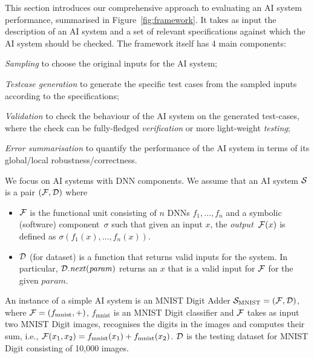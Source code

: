 \documentclass[10pt, conference, a4paper, final]{IEEEtran}
\begin{document}
This section introduces our comprehensive approach to evaluating an AI system performance, summarised in Figure~\ref{fig:framework}. It takes as input the description of an AI system and a set of relevant specifications against which the AI system should be checked. The framework itself has 4 main components: %
\begin{inparaenum}[\it (i)]
\item \emph{Sampling} to choose the original inputs for the AI system;
\item \emph{Testcase generation} to generate the specific test cases from the sampled inputs according to the specifications;
\item \emph{Validation} to check the behaviour of the AI system on the generated test-cases, where the check can be fully-fledged \emph{verification} or more light-weight \emph{testing};
\item \emph{Error summarisation} to quantify the performance of the AI system in terms of its global/local robustness/correctness.
\end{inparaenum}



We focus on AI systems with DNN components. We assume that an AI system $\S$ is a pair $(\F,\D)$ where
\begin{itemize}
\item $\F$ is the functional unit consisting of $n$ DNNs $f_1,\dots,f_n$ and a symbolic (software) component~$\sigma$ such that given an input $x$, the \emph{output}~$\F(x)$ is defined as $\sigma(f_1(x),\dots,f_n(x))$.
\item  $\D$ (for dataset) is a function that returns valid inputs for the system. In particular, $\D.\mathit{next}(\mathit{param})$ returns an $x$ that is a valid input for $\F$ for the given $\mathit{param}$.
\end{itemize}

\begin{example}
  An instance of a simple AI system is an MNIST Digit Adder $\S_{\text{MNIST}} = (\F,\D)$, where $\F = (f_{\text{mnist}}, +)$, $f_{\text{mnist}}$ is an MNIST Digit classifier and $\F$ takes as input two MNIST Digit images, recognises the digits in the images and computes their sum, i.e., $\F(x_1,x_2) = f_{\text{mnist}}(x_1) + f_{\text{mnist}}(x_2)$. $\D$ is the testing dataset for MNIST Digit consisting of 10,000 images.
\end{example}
\end{document}
